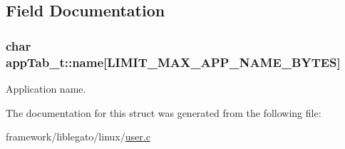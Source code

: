 \subsection{Field Documentation}
\subsubsection[{\texorpdfstring{name}{name}}]{\setlength{\rightskip}{0pt plus 5cm}char app\+Tab\+\_\+t\+::name\mbox{[}{\bf L\+I\+M\+I\+T\+\_\+\+M\+A\+X\+\_\+\+A\+P\+P\+\_\+\+N\+A\+M\+E\+\_\+\+B\+Y\+T\+ES}\mbox{]}}\hypertarget{structapp_tab__t_afe04e8994943f96a04e9abd761067a29}{}\label{structapp_tab__t_afe04e8994943f96a04e9abd761067a29}


Application name. 



The documentation for this struct was generated from the following file\+:\begin{DoxyCompactItemize}
\item 
framework/liblegato/linux/\hyperlink{user_8c}{user.\+c}\end{DoxyCompactItemize}
